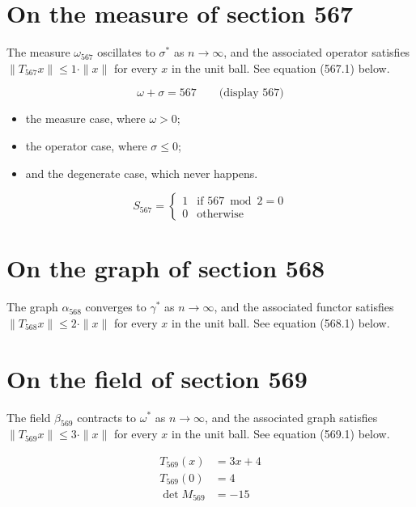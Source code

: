 \documentclass{article}
\begin{document}
\section{On the measure of section 567}
The measure $\omega_{567}$ oscillates to $\sigma^{*}$ as $n \to \infty$,
and the associated operator satisfies $\|T_{567} x\| \leq 1 \cdot \|x\|$
for every $x$ in the unit ball. See equation (567.1) below.

$$
\omega + \sigma = 567 \qquad \text{(display 567)}
$$

\begin{itemize}
  \item the measure case, where $\omega > 0$;
  \item the operator case, where $\sigma \leq 0$;
  \item and the degenerate case, which never happens.
\end{itemize}

\begin{equation}
S_{567} = \begin{cases} 1 & \text{if } 567 \bmod 2 = 0 \\ 0 & \text{otherwise} \end{cases}
\end{equation}

\section{On the graph of section 568}
The graph $\alpha_{568}$ converges to $\gamma^{*}$ as $n \to \infty$,
and the associated functor satisfies $\|T_{568} x\| \leq 2 \cdot \|x\|$
for every $x$ in the unit ball. See equation (568.1) below.

\section{On the field of section 569}
The field $\beta_{569}$ contracts to $\omega^{*}$ as $n \to \infty$,
and the associated graph satisfies $\|T_{569} x\| \leq 3 \cdot \|x\|$
for every $x$ in the unit ball. See equation (569.1) below.

\begin{align}
T_{569}(x) &= 3 x + 4 \\
T_{569}(0) &= 4 \\
\det M_{569} &= -15
\end{align}
\end{document}
